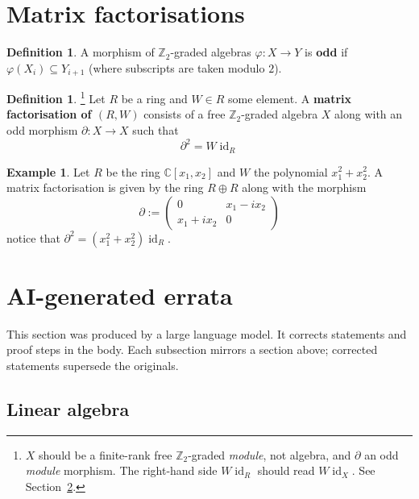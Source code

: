 \documentclass[12pt]{article}
\theoremstyle{plain}
\theoremstyle{definition}
\newtheorem{defn}[thm]{Definition} %
\newtheorem{example}[thm]{Example}
\newcommand{\bb}[1]{\mathbb{#1}}
\newcommand{\lto}{\longrightarrow}
\begin{document}
\section{Matrix factorisations}
\begin{defn}
A morphism of $\bb{Z}_2$-graded algebras $\varphi:X \lto Y$ is \textbf{odd} if $\varphi(X_i) \subseteq Y_{i+1}$ (where subscripts are taken modulo $2$).
\end{defn}
\begin{defn}\footnote{$X$ should be a finite-rank free $\bb{Z}_2$-graded \emph{module}, not algebra, and $\partial$ an odd \emph{module} morphism. The right-hand side $W\operatorname{id}_R$ should read $W\operatorname{id}_X$. See Section~\ref{sec:errata}.}
Let $R$ be a ring and $W \in R$ some element. A \textbf{matrix factorisation of $(R,W)$} consists of a free $\bb{Z}_2$-graded algebra $X$ along with an odd morphism $\partial: X \lto X$ such that
\begin{equation}
\partial^2 = W\operatorname{id}_R
\end{equation}
\end{defn}
\begin{example}
Let $R$ be the ring $\bb{C}[x_1,x_2]$ and $W$ the polynomial $x_1^2 + x_2^2$. A matrix factorisation is given by the ring $R \oplus R$ along with the morphism
\begin{equation}
\partial := 
\begin{pmatrix}
0 & x_1 - ix_2\\
x_1 + ix_2 & 0
\end{pmatrix}
\end{equation}
notice that $\partial^2 = (x_1^2 + x_2^2)\operatorname{id}_R$.
\end{example}











\clearpage
\section{AI-generated errata}
\label{sec:errata}

This section was produced by a large language model. It corrects statements and proof steps in the body. Each subsection mirrors a section above; corrected statements supersede the originals.

\subsection{Linear algebra}
\end{document}

